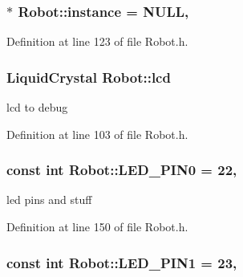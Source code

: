 \hypertarget{classRobot_aad5c5d6db601aac62393d47ec9385fa3}{
\subsubsection[{instance}]{ $\ast$ Robot\-::instance = N\-U\-L\-L\hspace{0.3cm}{\ttfamily [static]}, {\ttfamily [private]}}}\label{classRobot_aad5c5d6db601aac62393d47ec9385fa3}


Definition at line 123 of file Robot.\-h.

\hypertarget{classRobot_aa2182958e636a5b3e0383643a48ca6f8}{
\subsubsection[{lcd}]{\setlength{\rightskip}{0pt plus 5cm}Liquid\-Crystal Robot\-::lcd}}\label{classRobot_aa2182958e636a5b3e0383643a48ca6f8}


lcd to debug 



Definition at line 103 of file Robot.\-h.

\hypertarget{classRobot_a431ea8916b52ddfddbe6d80a09fe71e0}{
\subsubsection[{L\-E\-D\-\_\-\-P\-I\-N0}]{\setlength{\rightskip}{0pt plus 5cm}const int Robot\-::\-L\-E\-D\-\_\-\-P\-I\-N0 = 22\hspace{0.3cm}{\ttfamily [static]}, {\ttfamily [private]}}}\label{classRobot_a431ea8916b52ddfddbe6d80a09fe71e0}
led pins and stuff 

Definition at line 150 of file Robot.\-h.

\hypertarget{classRobot_a4c6f4e38b77bf470d757ebea1b8c3cf0}{
\subsubsection[{L\-E\-D\-\_\-\-P\-I\-N1}]{\setlength{\rightskip}{0pt plus 5cm}const int Robot\-::\-L\-E\-D\-\_\-\-P\-I\-N1 = 23\hspace{0.3cm}{\ttfamily [static]}, {\ttfamily [private]}}}\label{classRobot_a4c6f4e38b77bf470d757ebea1b8c3cf0}


